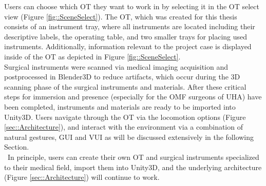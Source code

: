 Users can choose which OT they want to work in by selecting it in the OT select view (Figure \ref{fig::SceneSelect}).
The OT, which was created for this thesis consists of an instrument tray, where all instruments are located including their descriptive labels, the operating table, and two smaller trays 
for placing used instruments.
Additionally, information relevant to the project case is displayed inside of the OT as depicted in Figure \ref{fig::SceneSelect}.
\\ Surgical instruments were scanned via medical imaging acquisition and postprocessed in Blender3D to reduce artifacts, which occur during the 3D scanning phase of the surgical instruments and materials.
After these critical steps for immersion and presence (especially for the OMF surgeons of UHA) have been completed, instruments and materials are ready to be imported into Unity3D.
Users navigate through the OT via the locomotion options (Figure \ref{sec::Architecture}), and interact with the environment via a combination of natural gestures, GUI and VUI as will be discussed 
extensively in the following Section.
\\ In principle, users can create their own OT and surgical instruments specialized to their medical field, import them into Unity3D, and the underlying architecture (Figure \ref{sec::Architecture}) 
will continue to work.